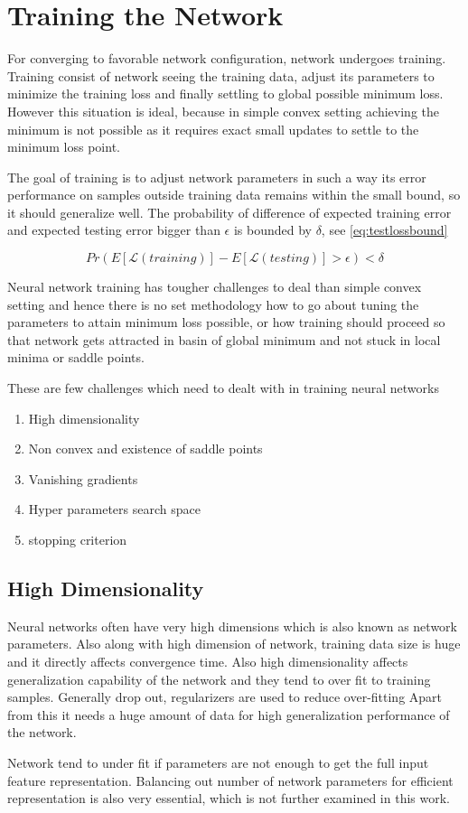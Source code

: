 

\chapter{Training the Network}\label{chap:training}

For converging to favorable network configuration, network undergoes training. Training consist of network seeing the training data, adjust its parameters to minimize the training loss and finally settling to global possible minimum loss. However this situation is ideal, because in simple convex setting achieving the minimum is not possible as it requires exact small updates to settle to the minimum loss point.

The goal of training is to adjust network parameters in such a way its error performance on samples outside training data remains within the small bound, so it should generalize well. The probability of difference of expected training error and expected testing error bigger than $\epsilon$ is bounded by $\delta$, see \ref{eq:testlossbound}

\begin{equation}\label{eq:testlossbound}
Pr(E[\mathcal{L}(training)]-E[\mathcal{L}(testing)] > \epsilon) < \delta 
\end{equation}


Neural network training has tougher challenges to deal than simple convex setting and hence there is no set methodology how to go about tuning the parameters to attain minimum loss possible, or how training should proceed so that network gets attracted in basin of global minimum and not stuck in local minima or saddle points.

These are few challenges which need to dealt with in training neural networks
\begin{enumerate}
	\item High dimensionality
	\item Non convex and existence of saddle points
	\item Vanishing gradients
    \item Hyper parameters search space
    \item stopping criterion
\end{enumerate}

\section{High Dimensionality}

Neural networks often have very high dimensions which is also known as network parameters. Also along with high dimension of network, training data size is huge and it directly affects convergence time. Also high dimensionality affects generalization capability of the network and they tend to over fit to training samples. Generally drop out, regularizers are used to reduce over-fitting Apart from this it needs a huge amount of data for high generalization performance of the network.

Network tend to under fit if parameters are not enough to get the full input feature representation. Balancing out number of network parameters for efficient representation is also very essential, which is not further examined in this work.